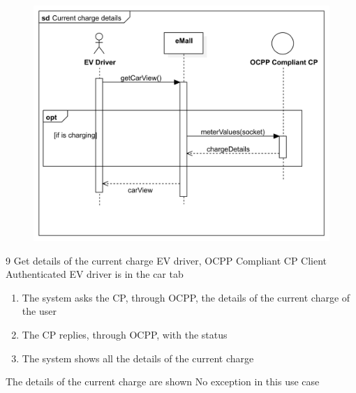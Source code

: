 \usecase
{
    \begin{figure}[H]
        \centering
        \includegraphics[scale=0.9]{src/sequence_diagram/currentChargeDetails.png}
    \end{figure}
}
{9}
{Get details of the current charge}
{EV driver, OCPP Compliant CP Client}
{Authenticated EV driver is in the car tab}
{
    \begin{enumerate}
        \item The system asks the CP, through OCPP, the details of the current charge of the user
        \item The CP replies, through OCPP, with the status
        \item The system shows all the details of the current charge
    \end{enumerate}
}
{The details of the current charge are shown}
{
    No exception in this use case
}
{
}

